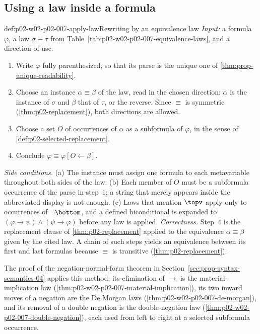 \subsection{Using a law inside a formula}
\label{sec:p02-w02-p02-007-application}

\begin{hbmethod}{def:p02-w02-p02-007-apply-law}{Rewriting by an equivalence law}
\emph{Input:} a formula \(\varphi\), a law \(\sigma\equiv\tau\) from
Table~\ref{tab:p02-w02-p02-007-equivalence-laws}, and a direction of use.
\begin{enumerate}
  \item Write \(\varphi\) fully parenthesized, so that its parse is the
        unique one of \cref{thm:prop-unique-readability}.
  \item Choose an instance \(\alpha\equiv\beta\) of the law, read in the
        chosen direction: \(\alpha\) is the instance of \(\sigma\) and
        \(\beta\) that of \(\tau\), or the reverse.  Since \(\equiv\) is
        symmetric (\cref{thm:p02-replacement}), both directions are allowed.
  \item Choose a set \(O\) of occurrences of \(\alpha\) as a subformula of
        \(\varphi\), in the sense of \cref{def:p02-selected-replacement}.
  \item Conclude \(\varphi\equiv\varphi[O\leftarrow\beta]\).
\end{enumerate}
\emph{Side conditions.}  (a) The instance must assign one formula to each
metavariable throughout both sides of the law.  (b) Each member of \(O\)
must be a subformula occurrence of the parse in step~1; a string that merely
appears inside the abbreviated display is not enough.  (c) Laws that
mention \(\topv\) apply only to occurrences of \(\neg\bottom\), and a
defined biconditional is expanded to
\((\varphi\to\psi)\land(\psi\to\varphi)\) before any law is applied.
\emph{Correctness.} Step~4 is the replacement clause of
\cref{thm:p02-replacement} applied to the equivalence \(\alpha\equiv\beta\)
given by the cited law.  A chain of such steps yields an equivalence between
its first and last formulas because \(\equiv\) is transitive
(\cref{thm:p02-replacement}).
\end{hbmethod}

The proof of the negation-normal-form theorem in
Section~\ref{sec:prop-syntax-semantics-04} applies this method: its
elimination of \(\to\) is the material-implication law
(\cref{thm:p02-w02-p02-007-material-implication}), its two inward moves of a
negation are the De Morgan laws (\cref{thm:p02-w02-p02-007-de-morgan}), and
its removal of a double negation is the double-negation law
(\cref{thm:p02-w02-p02-007-double-negation}), each used from left to right at
a selected subformula occurrence.

